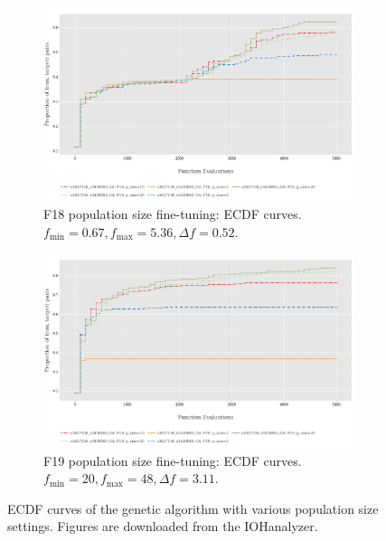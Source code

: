 \documentclass{article}
\begin{document}
\begin{figure}[!ht]
    \begin{subfigure}[h]{0.95\linewidth}
        \includegraphics[width=\linewidth]{ga/f18/psize_ecdf.png}
        \caption{F18 population size fine-tuning: ECDF curves. $f_{\min} = 0.67, f_{\max} = 5.36, \Delta f = 0.52$.}
    \end{subfigure}
    \hfill
    \begin{subfigure}[h]{0.95\linewidth}
        \includegraphics[width=\linewidth]{ga/f19/psize_ecdf.png}
        \caption{F19 population size fine-tuning: ECDF curves. $f_{\min} = 20, f_{\max} = 48, \Delta f = 3.11$.}
    \end{subfigure}
    \caption{ECDF curves of the genetic algorithm with various population size settings. Figures are downloaded from the IOHanalyzer.}
    \label{fig:experi-ga-psize-ecdf}
\end{figure}
\end{document}

